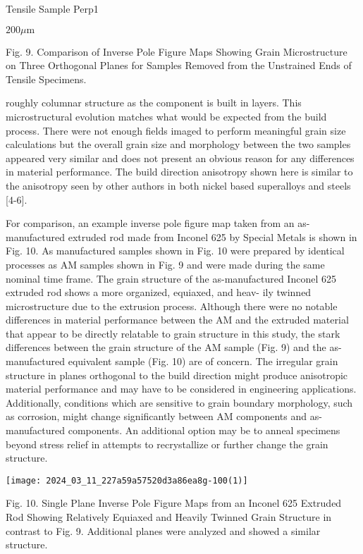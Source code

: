 \documentclass[10pt]{article}
\begin{document}
Tensile Sample Perp1

$200 \mu \mathrm{m}$

Fig. 9. Comparison of Inverse Pole Figure Maps Showing Grain Microstructure on Three Orthogonal Planes for Samples Removed from the Unstrained Ends of Tensile Specimens.

roughly columnar structure as the component is built in layers. This microstructural evolution matches what would be expected from the build process. There were not enough fields imaged to perform meaningful grain size calculations but the overall grain size and morphology between the two samples appeared very similar and does not present an obvious reason for any differences in material performance. The build direction anisotropy shown here is similar to the anisotropy seen by other authors in both nickel based superalloys and steels [4-6].

For comparison, an example inverse pole figure map taken from an as-manufactured extruded rod made from Inconel 625 by Special Metals is shown in Fig. 10. As manufactured samples shown in Fig. 10 were prepared by identical processes as AM samples shown in Fig. 9 and were made during the same nominal time frame. The grain structure of the as-manufactured Inconel 625 extruded rod shows a more organized, equiaxed, and heav- ily twinned microstructure due to the extrusion process. Although there were no notable differences in material performance between the AM and the extruded material that appear to be directly relatable to grain structure in this study, the stark differences between the grain structure of the AM sample (Fig. 9) and the as-manufactured equivalent sample (Fig. 10) are of concern. The irregular grain structure in planes orthogonal to the build direction might produce anisotropic material performance and may have to be considered in engineering applications. Additionally, conditions which are sensitive to grain boundary morphology, such as corrosion, might change significantly between AM components and as-manufactured components. An additional option may be to anneal specimens beyond stress relief in attempts to recrystallize or further change the grain structure.

\begin{center}
\texttt{[image: 2024\_03\_11\_227a59a57520d3a86ea8g-100(1)]}
\end{center}

Fig. 10. Single Plane Inverse Pole Figure Maps from an Inconel 625 Extruded Rod Showing Relatively Equiaxed and Heavily Twinned Grain Structure in contrast to Fig. 9. Additional planes were analyzed and showed a similar structure.
\end{document}
